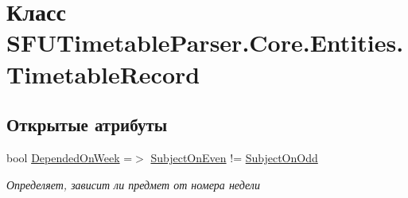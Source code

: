 \hypertarget{class_s_f_u_timetable_parser_1_1_core_1_1_entities_1_1_timetable_record}{}\section{Класс S\+F\+U\+Timetable\+Parser.\+Core.\+Entities.\+Timetable\+Record}
\label{class_s_f_u_timetable_parser_1_1_core_1_1_entities_1_1_timetable_record}
\subsection*{Открытые атрибуты}
\begin{DoxyCompactItemize}
\item 
bool \hyperlink{class_s_f_u_timetable_parser_1_1_core_1_1_entities_1_1_timetable_record_a9033a08965a70fced0f1644baf261563}{Depended\+On\+Week} =$>$ \hyperlink{class_s_f_u_timetable_parser_1_1_core_1_1_entities_1_1_timetable_record_a453625dea6c24ea69d5113ce9f60d994}{Subject\+On\+Even} != \hyperlink{class_s_f_u_timetable_parser_1_1_core_1_1_entities_1_1_timetable_record_a599e9b6010ce9af0447fa32c42948fb9}{Subject\+On\+Odd}
\begin{DoxyCompactList}\small\item\em Определяет, зависит ли предмет от номера недели \end{DoxyCompactList}\end{DoxyCompactItemize}
